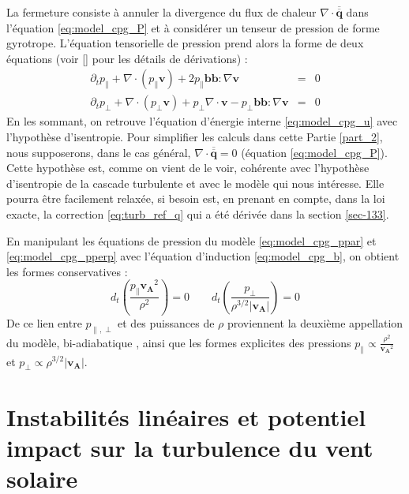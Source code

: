 La fermeture  consiste à annuler la divergence du flux de chaleur $\nabla \cdot \overline{\overline{\boldsymbol{q}}}$ dans l'équation \eqref{eq:model_cpg_P} et à considérer un tenseur de pression de forme gyrotrope. L'équation tensorielle de pression prend alors la forme de deux équations (voir [\cite{hunana_introductory_2019}] pour les détails de dérivations) : 
\begin{eqnarray}
\label{eq:model_cpg_ppar}     \partial_t p_{\parallel} + \nabla \cdot \left(p_{\parallel} \boldsymbol{v} \right) + 2 p_{\parallel} \boldsymbol{b}\boldsymbol{b} : \nabla \boldsymbol{v}   &=& 0 \\
\label{eq:model_cpg_pperp}     \partial_t p_{\perp} + \nabla \cdot \left(p_{\perp} \boldsymbol{v} \right) + p_{\perp} \nabla \cdot \boldsymbol{v}- p_{\perp} \boldsymbol{b}\boldsymbol{b} : \nabla \boldsymbol{v}   &=& 0 
\end{eqnarray}
En les sommant, on retrouve l'équation d'énergie interne \eqref{eq:model_cpg_u} avec l'hypothèse d'isentropie. Pour simplifier les calculs dans cette Partie \ref{part_2}, nous supposerons, dans le cas général, $\nabla \cdot \overline{\overline{\boldsymbol{q}}} = 0$ (équation \eqref{eq:model_cpg_P}). Cette hypothèse est, comme on vient de le voir, cohérente avec l'hypothèse d'isentropie de la cascade turbulente et avec le modèle  qui nous intéresse. Elle pourra être facilement relaxée, si besoin est, en prenant en compte, dans la loi exacte, la correction \eqref{eq:turb_ref_q} qui a été dérivée dans la section \ref{sec-133}.

En manipulant les équations de pression du modèle  \eqref{eq:model_cpg_ppar} et \eqref{eq:model_cpg_pperp} avec l'équation d'induction \eqref{eq:model_cpg_b}, on obtient les formes conservatives : 
\begin{equation}
\label{eq:model_cpg_biadiab}    d_t \left(\frac{p_{\parallel}\boldsymbol{v_A}^2}{\rho^2}\right) = 0\qquad d_t \left(\frac{p_{\perp}}{\rho^{3/2} |\boldsymbol{v_A}|}\right)=0
\end{equation}
De ce lien entre $p_{\parallel,\perp}$ et des puissances de $\rho$ proviennent la deuxième appellation du modèle, \og bi-adiabatique \fg{}, ainsi que les formes explicites des pressions $p_{\parallel} \propto \frac{\rho^2}{\boldsymbol{v_A}^2}$ et $p_{\perp}\propto \rho^{3/2} |\boldsymbol{v_A}|$. 

\section{Instabilités linéaires et potentiel impact sur la turbulence du vent solaire}
\label{sec-212}

